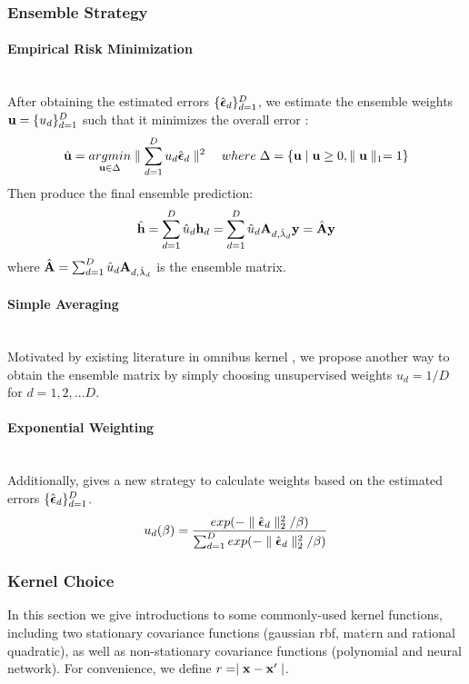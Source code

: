 \documentclass[11pt]{article}
\begin{document}
\subsubsection{{Ensemble Strategy}}
\paragraph{Empirical Risk Minimization}\mbox{}\\
After obtaining the estimated errors $\{\hat{\boldsymbol{\epsilon}}_d\}_{d=1}^D$, we estimate the ensemble weights ${\bf u}=\{u_d\}_{d=1}^D$ such that it minimizes the overall error \citep{liu_robust_2017}:
\begin{align*}
\hat{{\bf u}}=\underset{{\bf u} \in \Delta}{argmin}\parallel \sum_{d=1}^Du_d\hat{\boldsymbol{\epsilon}}_d\parallel^2 \quad where\; \Delta=\{{\bf u} \mid {\bf u} \geq 0, \parallel {\bf u} \parallel_1=1\}
\end{align*}
Then produce the final ensemble prediction:
\begin{align*}
\hat{{\bf h}}=\sum_{d=1}^D \hat{u}_d {\bf h}_d=\sum_{d=1}^D \hat{u}_d {\bf A}_{d,\hat{\lambda}_d}{\bf y}=\hat{{\bf A}}{\bf y}
\end{align*}
where $\hat{{\bf A}}=\sum_{d=1}^D \hat{u}_d {\bf A}_{d,\hat{\lambda}_d}$ is the ensemble matrix.

\paragraph{Simple Averaging}\mbox{}\\
Motivated by existing literature in omnibus kernel \citep{zhan_fast_2017}, we propose another way to obtain the ensemble matrix by simply choosing unsupervised weights $u_d=1/D$ for $d=1,2,...D$.

\paragraph{Exponential Weighting}\mbox{}\\
Additionally, \citep{dalalyan_aggregation_2007} gives a new strategy to calculate weights based on the estimated errors $\{\hat{\boldsymbol{\epsilon}}_d\}_{d=1}^D$. 
\begin{align*}
u_d(\beta)=\frac{exp(-\parallel \hat{\boldsymbol{\epsilon}}_d \parallel_2^2/\beta)}{\sum_{d=1}^Dexp(-\parallel \hat{\boldsymbol{\epsilon}}_d \parallel_2^2/\beta)}
\end{align*}


\subsubsection{{Kernel Choice}}
In this section \citep{press_gaussian_2006} we give introductions to some commonly-used kernel functions, including two stationary covariance functions (gaussian rbf, mat$\acute{e}$rn and rational quadratic), as well as non-stationary covariance functions (polynomial and neural network). For convenience, we define $r=\mid{\bf x}-{\bf x}'\mid$.
\end{document}
